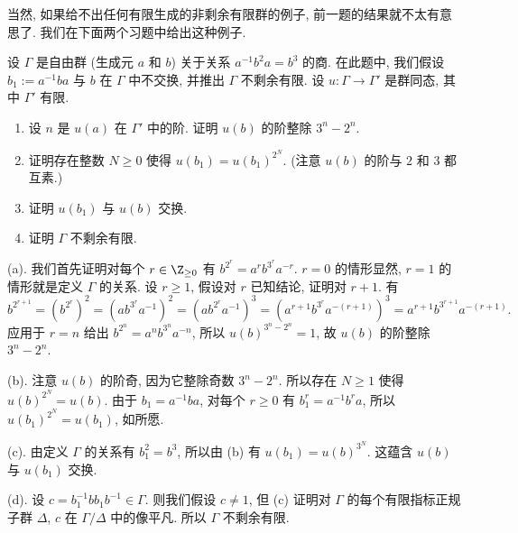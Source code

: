 当然, 如果给不出任何有限生成的非剩余有限群的例子, 前一题的结果就不太有意思了. 我们在下面两个习题中给出这种例子.

\begin{exercise}
\label{ex:I.5.5.7}
设 $\Gamma$ 是自由群 (生成元 $a$ 和 $b$) 关于关系 $a^{-1}b^2a = b^3$ 的商. 在此题中, 我们假设 $b_1 := a^{-1}ba$ 与 $b$ 在 $\Gamma$ 中不交换, 并推出 $\Gamma$ 不剩余有限.
设 $u \colon \Gamma \to \Gamma'$ 是群同态, 其中 $\Gamma'$ 有限.
\begin{enumerate}
\item[(a)] 设 $n$ 是 $u(a)$ 在 $\Gamma'$ 中的阶. 证明 $u(b)$ 的阶整除 $3^n - 2^n$.
\item[(b)] 证明存在整数 $N \geq 0$ 使得 $u(b_1) = u(b_1)^{2^N}$. (注意 $u(b)$ 的阶与 $2$ 和 $3$ 都互素.)
\item[(c)] 证明 $u(b_1)$ 与 $u(b)$ 交换.
\item[(d)] 证明 $\Gamma$ 不剩余有限.
\end{enumerate}
\end{exercise}

\begin{solution}
(a). 我们首先证明对每个 $r \in \Z_{\geq 0}$ 有 $b^{2^r} = a^rb^{3^r}a^{-r}$. $r = 0$ 的情形显然, $r = 1$ 的情形就是定义 $\Gamma$ 的关系. 设 $r \geq 1$, 假设对 $r$ 已知结论, 证明对 $r+1$. 有
\[
b^{2^{r+1}} = (b^{2^r})^2 = (ab^{3^r}a^{-1})^2 = (ab^{2^r}a^{-1})^3 = (a^{r+1}b^{3^r}a^{-(r+1)})^3 = a^{r+1}b^{3^{r+1}}a^{-(r+1)}.
\]
应用于 $r = n$ 给出 $b^{2^n} = a^nb^{3^n}a^{-n}$, 所以 $u(b)^{3^n - 2^n} = 1$, 故 $u(b)$ 的阶整除 $3^n - 2^n$.

(b). 注意 $u(b)$ 的阶奇, 因为它整除奇数 $3^n - 2^n$. 所以存在 $N \geq 1$ 使得 $u(b)^{2^N} = u(b)$. 由于 $b_1 = a^{-1}ba$, 对每个 $r \geq 0$ 有 $b_1^r = a^{-1}b^ra$, 所以 $u(b_1)^{2^N} = u(b_1)$, 如所愿.

(c). 由定义 $\Gamma$ 的关系有 $b_1^2 = b^3$, 所以由 (b) 有 $u(b_1) = u(b)^{3^N}$. 这蕴含 $u(b)$ 与 $u(b_1)$ 交换.

(d). 设 $c = b_1^{-1}bb_1b^{-1} \in \Gamma$. 则我们假设 $c \neq 1$, 但 (c) 证明对 $\Gamma$ 的每个有限指标正规子群 $\Delta$, $c$ 在 $\Gamma/\Delta$ 中的像平凡. 所以 $\Gamma$ 不剩余有限.
\end{solution}

